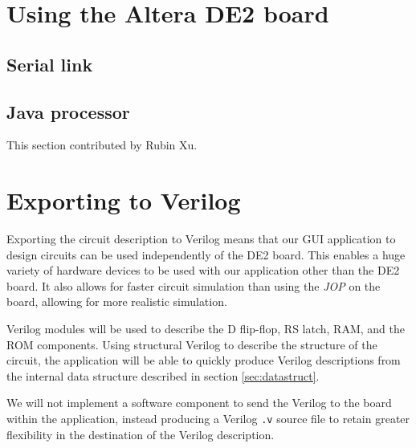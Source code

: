 \documentclass[12pt, a4paper, oneside,titlepage]{article}
\begin{document}
\section{Using the Altera DE2 board}
\subsection{Serial link}
\subsection{Java processor}
This section contributed by Rubin Xu.



\section{Exporting to Verilog}
Exporting the circuit description to Verilog means that our GUI application to design circuits can be used independently of the DE2 board. This enables a huge variety of hardware devices to be used with our application other than the DE2 board. It also allows for faster circuit simulation than using the \emph{JOP} on the board, allowing for more realistic simulation. 

Verilog modules will be used to describe the D flip-flop, RS latch, RAM, and the ROM components. Using structural Verilog to describe the structure of the circuit, the application will be able to quickly produce Verilog descriptions from the internal data structure described in section \ref{sec:datastruct}.

We will not implement a software component to send the Verilog to the board within the application, instead producing a Verilog \texttt{.v} source file to retain greater flexibility in the destination of the Verilog description. 
\end{document}
